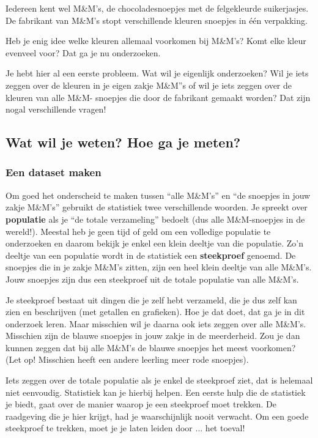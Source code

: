 \documentclass[12pt,twoside]{article}
\begin{document}
Iedereen kent wel M\&M’s, de chocoladesnoepjes met de felgekleurde suikerjasjes. De fabrikant van
M\&M’s stopt verschillende kleuren snoepjes in één verpakking.

Heb je enig idee welke kleuren allemaal voorkomen bij M\&M’s?
Komt elke kleur evenveel voor? Dat ga je nu onderzoeken.

Je hebt hier al een eerste probleem. Wat wil je eigenlijk
onderzoeken? Wil je iets zeggen over de kleuren in je eigen zakje
M\&M”s of wil je iets zeggen over de kleuren van alle M\&M-
snoepjes die door de fabrikant gemaakt worden? Dat zijn nogal
verschillende vragen!

\subsection{Wat wil je weten? Hoe ga je meten?}

\subsubsection{Een dataset maken}

Om goed het onderscheid te maken tussen “alle M\&M’s” en “de snoepjes in jouw zakje M\&M’s”
gebruikt de statistiek twee verschillende woorden. Je spreekt over {\bf populatie} als je “de totale
verzameling” bedoelt (dus alle M\&M-snoepjes in de wereld!). Meestal heb je geen tijd of geld om een volledige
populatie te onderzoeken en daarom bekijk je enkel een klein deeltje van die populatie. Zo’n deeltje
van een populatie wordt in de statistiek een {\bf steekproef} genoemd. De snoepjes die in je zakje
M\&M’s zitten, zijn een heel klein deeltje van alle M\&M’s. Jouw snoepjes zijn dus een steekproef uit
de totale populatie van alle M\&M’s.

Je steekproef bestaat uit dingen die je zelf hebt verzameld, die je dus zelf kan zien en beschrijven
(met getallen en grafieken). Hoe je dat doet, dat ga je in dit onderzoek leren. Maar misschien wil je
daarna ook iets zeggen over alle M\&M’s. Misschien zijn de blauwe snoepjes in jouw zakje in de
meerderheid. Zou je dan kunnen zeggen dat bij alle M\&M’s de blauwe snoepjes het meest
voorkomen? (Let op! Misschien heeft een andere leerling meer rode snoepjes).

Iets zeggen over de totale populatie als je enkel de steekproef ziet, dat is helemaal niet eenvoudig.
Statistiek kan je hierbij helpen. Een eerste hulp die de statistiek je biedt, gaat over de manier waarop
je een steekproef moet trekken. De raadgeving die je hier krijgt, had je waarschijnlijk nooit
verwacht. Om een goede steekproef te trekken, moet je je laten leiden door ... het toeval!
\end{document}
